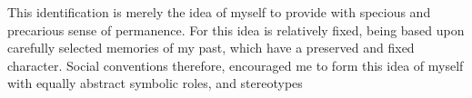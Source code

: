 \documentclass[10pt,a4paper,ragged2e,withhyper]{altacv}
\begin{document}




\makecvheader




\begin{raggedright}
This identification is merely the idea of myself to provide with
specious and precarious sense of permanence. For this idea is
relatively fixed, being based upon carefully selected memories of
my past, which have a preserved and fixed character. Social
conventions therefore, encouraged me to form this idea of myself
with equally abstract symbolic roles, and stereotypes
\end{raggedright}
\end{document}
